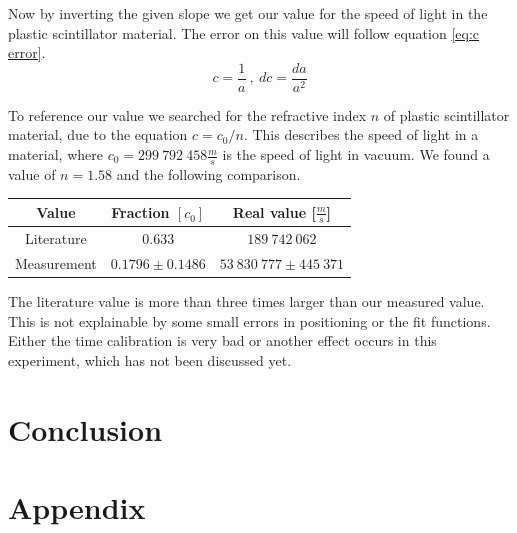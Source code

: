 \documentclass[]{article}
\begin{document}
Now by inverting the given slope we get our value for the speed of light in the plastic scintillator material. The error on this value will follow equation \ref{eq:c error}.
\begin{equation} \label{eq:c error}
c=\frac{1}{a}\:,\: dc=\frac{da}{a^2}
\end{equation}

To reference our value we searched for the refractive index $n$ of plastic scintillator material, due to the equation $ c= c_0 / n$. This describes the speed of light in a material, where $c_0 = 299\ 792\ 458 \frac{m}{s}$ is the speed of light in vacuum. We found a value of $n=1.58$ \cite{refractive index} and the following comparison.

\begin{table}[H]
\centering
\begin{tabular}{c|c|c}
Value & Fraction $[c_0]$ & Real value [$\frac{m}{s}$] \\ \hline \hline
Literature & $0.633$ & $189\ 742\ 062$  \\ \hline
Measurement & $0.1796 \pm 0.1486$ & $ 53\ 830\ 777 \pm 445\ 371$ \\ \hline
\end{tabular}
\end{table}

The literature value is more than three times larger than our measured value. This is not explainable by some small errors in positioning or the fit functions. Either the time calibration is very bad or another effect occurs in this experiment, which has not been discussed yet.



\section{Conclusion} %



\section{Appendix}\label{appendix}
\end{document}
